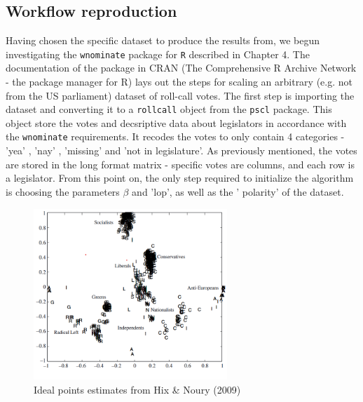 \documentclass[a4paper,12pt]{report}
\begin{document}
    \subsection{Workflow reproduction}\label{subsec:workflow-reproduction}
    Having chosen the specific dataset to produce the results from, we begun investigating the
    \texttt{wnominate}
    package for \texttt{R}
    described in Chapter 4. The documentation of the package in CRAN (The Comprehensive R
    Archive Network - the package manager for R) lays out the steps for scaling an arbitrary (e.g.
    not from the US
    parliament) dataset of roll-call votes. The first step is importing the dataset and converting
    it to a
    \texttt{rollcall} object from the \texttt{pscl}
    package. This object store the votes and decsriptive data about
    legislators in accordance with the \texttt{wnominate}
    requirements. It recodes the votes to only contain 4
    categories - 'yea' , 'nay' , 'missing' and 'not in legislature'. As previously mentioned, the
    votes are stored
    in the long format matrix - specific votes are columns, and each row is a legislator. From this
    point on, the
    only step required to initialize the algorithm is choosing the parameters \( \beta \)
    and 'lop', as well as the '
    polarity' of the dataset.

    \begin{figure}[H]
        \centering
        \includegraphics[width=0.65\textwidth]{Graphs/Screenshot 2024-06-09 220607}
        \caption{Ideal points estimates from Hix \& Noury (2009)}
        \label{fig:WNOMINATEHIX6}
    \end{figure}
\end{document}
